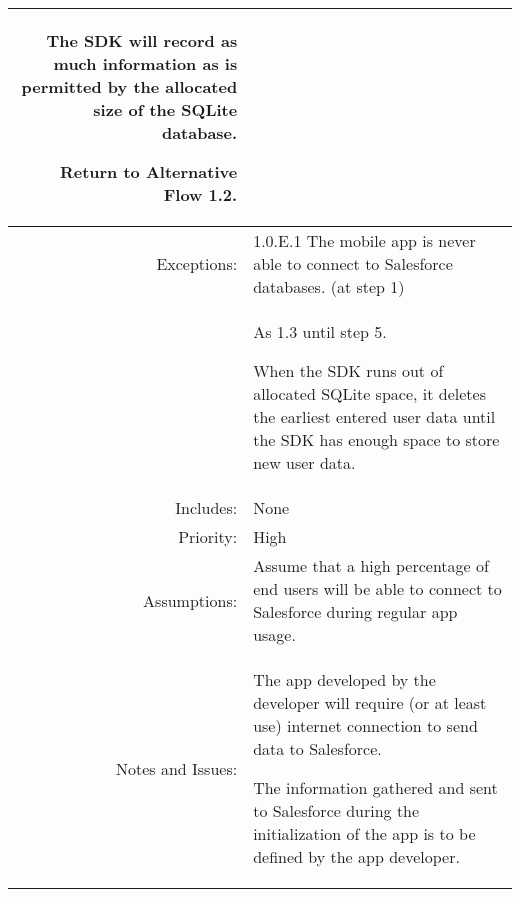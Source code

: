 \documentclass[12pt,oneside,letterpaper]{article}
\newenvironment{packed_enumerate}{ %
\vspace{-7mm}
\begin{enumerate}
  \setlength{\itemsep}{0pt}
  \setlength{\parskip}{0pt}
  \setlength{\parsep}{0pt}
}{\end{enumerate}
\vspace{-8mm}}
\begin{document}
\begin{longtable}{|r|p{3.8in}|}
\begin{packed_enumerate}
\item The SDK will record as much information as is permitted by the allocated size of the SQLite database.
\item Return to Alternative Flow 1.2.
\end{packed_enumerate}\\
\hline
Exceptions:&1.0.E.1 The mobile app is never able to connect to Salesforce databases. (at step 1)\\
& %
\begin{packed_enumerate}
\item As 1.3 until step 5.
\item When the SDK runs out of allocated SQLite space, it deletes the earliest entered user data until the SDK has enough space to store new user data.
\end{packed_enumerate}\\
\hline
Includes:&None\\
\hline
Priority:&High\\
\hline
Assumptions:&Assume that a high percentage of end users will be able to connect to Salesforce during regular app usage.\\
\hline
Notes and Issues:&
\begin{packed_enumerate}
\item The app developed by the developer will require (or at least use) internet connection to send data to Salesforce.
\item The information gathered and sent to Salesforce during the initialization of the app is to be defined by the app developer.
\end{packed_enumerate}\\
\hline
\end{longtable}




\clearpage
\end{document}
